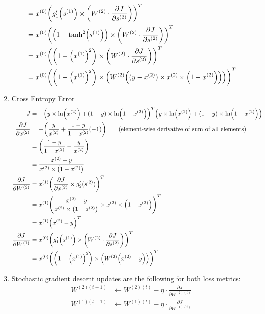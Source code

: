 \documentclass[11pt]{article}
\let\origleft\left
\let\origright\right
\renewcommand{\left}{\mathopen{}\mathclose\bgroup\origleft}
\renewcommand{\right}{\aftergroup\egroup\origright}
\newcommand{\p}[1]{\left(#1\right)}
\newcommand{\pderiv}[2]{\frac{\partial#1}{\partial#2}}
\renewcommand{\ln}[1]{\text{ln}\p{#1}}
\begin{document}
\begin{enumerate}[(1)]
\begin{align*}
&= x^{(0)}\p{g_1'\p{s^{(1)}}\times \p{W^{(2)}\cdot \pderiv J{s^{(2)}}}}^T\\
&= x^{(0)}\p{\p{1-\tanh^2\p{s^{(1)}}} \times \p{W^{(2)}\cdot \pderiv J{s^{(2)}}}}^T\\
&= x^{(0)}\p{\p{1-\p{x^{(1)}}^2} \times \p{W^{(2)}\cdot \pderiv J{s^{(2)}}}}^T\\
&= x^{(0)}\p{\p{1-\p{x^{(1)}}^2} \times \p{W^{(2)}\p{(y-x^{(2)})\times x^{(2)}\times\p{1-x^{(2)}}}}}^T
\end{align*}
\item Cross Entropy Error
\begin{align*}
J &= -\p{y\times\ln{x^{(2)}} + (1-y)\times\ln{1-x^{(2)}}}^T\p{y\times\ln{x^{(2)}} + (1-y)\times\ln{1-x^{(2)}}}\\
\pderiv J{x^{(2)}} &= -\p{\frac y{x^{(2)}} + \frac {1-y}{1-x^{(2)}}(-1)}\qquad\text{(element-wise derivative of sum of all elements)}\\
&= \p{\frac {1-y}{1-x^{(2)}} - \frac y{x^{(2)}}}\\
&= \frac{x^{(2)}-y}{x^{(2)}\times\p{1-x^{(2)}}}\\
\pderiv J{W^{(2)}} &= x^{(1)}\p{\pderiv J{x^{(2)}} \times g_2'(s^{(2)})}^T\\
&= x^{(1)}\p{\frac{x^{(2)}-y}{x^{(2)}\times\p{1-x^{(2)}}} \times x^{(2)}\times\p{1-x^{(2)}}}^T\\
&= x^{(1)}\p{x^{(2)}-y}^T\\
\pderiv J{W^{(1)}} &= x^{(0)}\p{g_1'\p{s^{(1)}}\times \p{W^{(2)}\cdot \pderiv J{s^{(2)}}}}^T\\
&= x^{(0)}\p{\p{1-\p{x^{(1)}}^2} \times \p{W^{(2)}\p{x^{(2)}-y}}}^T
\end{align*}
\item Stochastic gradient descent updates are the following for both loss metrics:
\begin{align*}
W^{(2)(t+1)} &\leftarrow W^{(2)(t)}-\eta\cdot\pderiv J{W^{(2)(t)}}\\
W^{(1)(t+1)} &\leftarrow W^{(1)(t)}-\eta\cdot\pderiv J{W^{(1)(t)}}
\end{align*}
\end{enumerate}


\newpage
\end{document}
